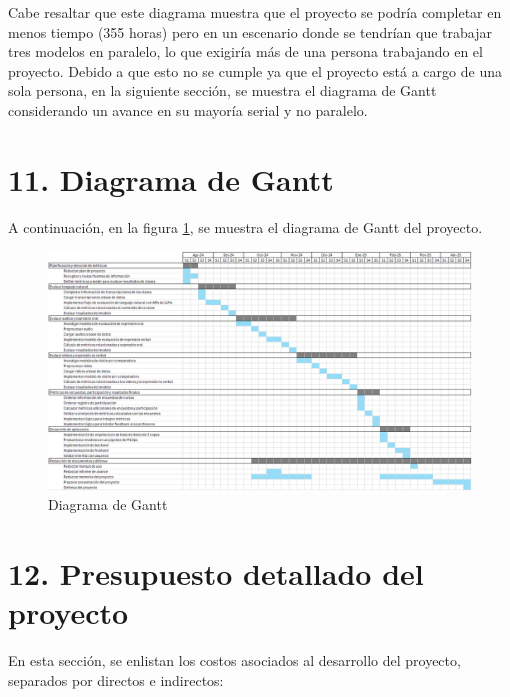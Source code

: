 \documentclass[
11pt, %
codirector, %
]{charter}
\begin{document}
Cabe resaltar que este diagrama muestra que el proyecto se podría completar en menos tiempo (355 horas) pero en un escenario donde se tendrían que trabajar tres modelos en paralelo, lo que exigiría más de una persona trabajando en el proyecto. Debido a que esto no se cumple ya que el proyecto está a cargo de una sola persona, en la siguiente sección, se muestra el diagrama de Gantt considerando un avance en su mayoría serial y no paralelo.

\section{11. Diagrama de Gantt}
\label{sec:gantt}

A continuación, en la figura \ref{fig:diagGantt}, se muestra el diagrama de Gantt del proyecto.

\begin{landscape}
\begin{figure}[htpb]
\centering 
\includegraphics[height=.9\textheight]{./Figuras/diagrama_gantt.png}
\caption{Diagrama de Gantt} %
\label{fig:diagGantt}
\end{figure}

\end{landscape}


\section{12. Presupuesto detallado del proyecto}
\label{sec:presupuesto}

En esta sección, se enlistan los costos asociados al desarrollo del proyecto, separados por directos e indirectos:
\end{document}

